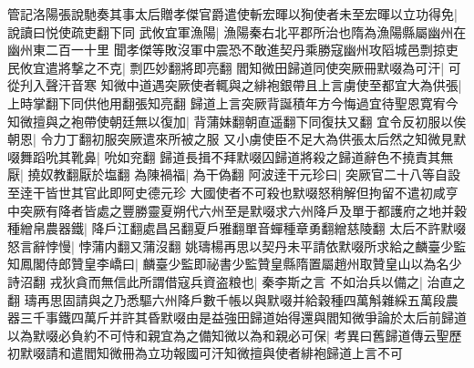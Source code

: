 管記洛陽張說馳奏其事太后贈孝傑官爵遣使斬宏暉以狥使者未至宏暉以立功得免|{
	說讀曰悦使疏吏翻下同}
武攸宜軍漁陽|{
	漁陽秦右北平郡所治也隋為漁陽縣屬幽州在幽州東二百一十里}
聞孝傑等敗沒軍中震恐不敢進契丹乘勝寇幽州攻䧟城邑剽掠吏民攸宜遣將撃之不克|{
	剽匹妙翻將即亮翻}
閻知微田歸道同使突厥冊默啜為可汗|{
	可從刋入聲汗音寒}
知微中道遇突厥使者輒與之緋袍銀帶且上言虜使至都宜大為供張|{
	上時掌翻下同供他用翻張知亮翻}
歸道上言突厥背誕積年方今悔過宜待聖恩寛宥今知微擅與之袍帶使朝廷無以復加|{
	背蒲妹翻朝直遥翻下同復扶又翻}
宜令反初服以俟朝恩|{
	令力丁翻初服突厥遣來所被之服}
又小虜使臣不足大為供張太后然之知微見默啜舞蹈吮其靴鼻|{
	吮如兖翻}
歸道長揖不拜默啜囚歸道將殺之歸道辭色不撓責其無厭|{
	撓奴教翻厭於塩翻}
為陳禍福|{
	為干偽翻}
阿波逹干元珍曰|{
	突厥官二十八等自設至逹干皆世其官此即阿史德元珍}
大國使者不可殺也默啜怒稍解但拘留不遣初咸亨中突厥有降者皆處之豐勝靈夏朔代六州至是默啜求六州降戶及單于都護府之地并穀種繒帛農器鐵|{
	降戶江翻處昌呂翻夏戶雅翻單音蟬種章勇翻繒慈陵翻}
太后不許默啜怒言辭悖慢|{
	悖蒲内翻又蒲沒翻}
姚璹楊再思以契丹未平請依默啜所求給之麟臺少監知鳳閣侍郎贊皇李嶠曰|{
	麟臺少監即祕書少監贊皇縣隋置屬趙州取贊皇山以為名少詩沼翻}
戎狄貪而無信此所謂借寇兵資盗粮也|{
	秦李斯之言}
不如治兵以備之|{
	治直之翻}
璹再思固請與之乃悉驅六州降戶數千帳以與默啜并給穀種四萬斛雜綵五萬段農器三千事鐵四萬斤并許其昏默啜由是益強田歸道始得還與閻知微爭論於太后前歸道以為默啜必負約不可恃和親宜為之備知微以為和親必可保|{
	考異曰舊歸道傳云聖歷初默啜請和遣閻知微冊為立功報國可汗知微擅與使者緋袍歸道上言不可}


